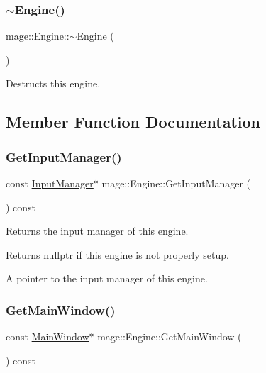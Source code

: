 \subsubsection{\texorpdfstring{$\sim$\+Engine()}{~Engine()}}
{\footnotesize\ttfamily mage\+::\+Engine\+::$\sim$\+Engine (\begin{DoxyParamCaption}{ }\end{DoxyParamCaption})\hspace{0.3cm}{\ttfamily [virtual]}}

Destructs this engine. 

\subsection{Member Function Documentation}
\hypertarget{classmage_1_1_engine_a9e8de859024c2b51d9b20ce498d6c07b}{}\label{classmage_1_1_engine_a9e8de859024c2b51d9b20ce498d6c07b} 
\subsubsection{\texorpdfstring{Get\+Input\+Manager()}{GetInputManager()}}
{\footnotesize\ttfamily const \hyperlink{classmage_1_1_input_manager}{Input\+Manager}$\ast$ mage\+::\+Engine\+::\+Get\+Input\+Manager (\begin{DoxyParamCaption}{ }\end{DoxyParamCaption}) const\hspace{0.3cm}{\ttfamily [noexcept]}}

Returns the input manager of this engine.

\begin{DoxyReturn}{Returns}
{\ttfamily nullptr} if this engine is not properly setup. 

A pointer to the input manager of this engine. 
\end{DoxyReturn}
\hypertarget{classmage_1_1_engine_ae12773fc604a46a3d94222ebcae2d593}{}\label{classmage_1_1_engine_ae12773fc604a46a3d94222ebcae2d593} 
\subsubsection{\texorpdfstring{Get\+Main\+Window()}{GetMainWindow()}}
{\footnotesize\ttfamily const \hyperlink{classmage_1_1_main_window}{Main\+Window}$\ast$ mage\+::\+Engine\+::\+Get\+Main\+Window (\begin{DoxyParamCaption}{ }\end{DoxyParamCaption}) const\hspace{0.3cm}{\ttfamily [noexcept]}}

